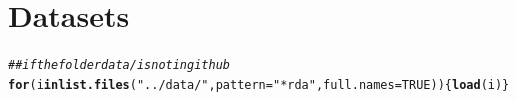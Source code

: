 \documentclass{article}\usepackage[]{graphicx}\usepackage[]{color}
\makeatletter
\newcommand{\hlnum}[1]{\textcolor[rgb]{0.686,0.059,0.569}{#1}}%
\newcommand{\hlstr}[1]{\textcolor[rgb]{0.192,0.494,0.8}{#1}}%
\newcommand{\hlcom}[1]{\textcolor[rgb]{0.678,0.584,0.686}{\textit{#1}}}%
\newcommand{\hlstd}[1]{\textcolor[rgb]{0.345,0.345,0.345}{#1}}%
\newcommand{\hlkwa}[1]{\textcolor[rgb]{0.161,0.373,0.58}{\textbf{#1}}}%
\newcommand{\hlkwc}[1]{\textcolor[rgb]{0.333,0.667,0.333}{#1}}%
\newcommand{\hlkwd}[1]{\textcolor[rgb]{0.737,0.353,0.396}{\textbf{#1}}}%
\newenvironment{kframe}{%
 \def\at@end@of@kframe{}%
 \ifinner\ifhmode%
  \def\at@end@of@kframe{\end{minipage}}%
  \begin{minipage}{\columnwidth}%
 \fi\fi%
 \def\FrameCommand##1{\hskip\@totalleftmargin \hskip-\fboxsep
 \colorbox{shadecolor}{##1}\hskip-\fboxsep
     \hskip-\linewidth \hskip-\@totalleftmargin \hskip\columnwidth}%
 \MakeFramed {\advance\hsize-\width
   \@totalleftmargin\z@ \linewidth\hsize
   \@setminipage}}%
 {\par\unskip\endMakeFramed%
 \at@end@of@kframe}
\newenvironment{knitrout}{}{} %
\makeatother
\begin{document}
\clearpage
\section{Datasets}
\begin{knitrout}
\color{fgcolor}\begin{kframe}
\begin{alltt}
\hlcom{## if the folder data/ is not in github}
\hlkwa{for}\hlstd{(i} \hlkwa{in} \hlkwd{list.files}\hlstd{(}\hlstr{"../data/"}\hlstd{,} \hlkwc{pattern} \hlstd{=} \hlstr{"*rda"}\hlstd{,} \hlkwc{full.names} \hlstd{=} \hlnum{TRUE}\hlstd{))\{}\hlkwd{load}\hlstd{(i)\}}
\end{alltt}
\end{kframe}
\end{knitrout}
\end{document}
